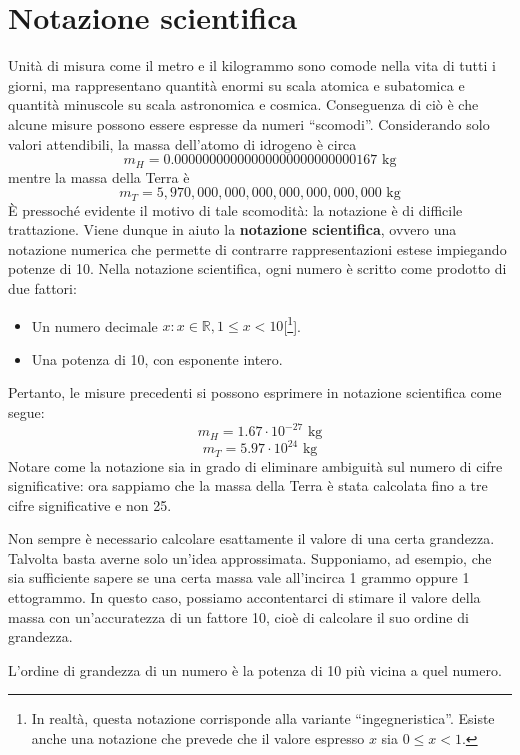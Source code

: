 \section{Notazione scientifica}
Unità di misura come il metro e il kilogrammo sono comode nella vita di tutti i
giorni, ma rappresentano quantità enormi su scala atomica e subatomica e quantità
minuscole su scala astronomica e cosmica. Conseguenza di ciò è che alcune misure
possono essere espresse da numeri ``scomodi''. Considerando solo valori attendibili,
la massa dell'atomo di idrogeno è circa
\[ m_H = 0.000 000 000 000 000 000 000 000 001 67 \text{ kg} \]
mentre la massa della Terra è
\[ m_T = 5,970,000,000,000,000,000,000,000 \text{ kg} \]
È pressoché evidente il motivo di tale scomodità: la notazione è di difficile
trattazione. Viene dunque in aiuto la \textbf{notazione scientifica}, ovvero una
notazione numerica che permette di contrarre rappresentazioni estese impiegando
potenze di 10. Nella notazione scientifica, ogni numero è scritto come prodotto
di due fattori:
\begin{itemize}
    \item Un numero decimale $x:x\in \mathbb{R}, 1\leq x < 10$[\footnote{In realtà, questa notazione corrisponde alla variante ``ingegneristica''. Esiste anche una notazione che prevede che il valore espresso $x$ sia $0\leq x < 1$.}].
    \item Una potenza di 10, con esponente intero.
\end{itemize}
Pertanto, le misure precedenti si possono esprimere in notazione scientifica come
segue:
\[ m_H = 1.67 \cdot 10^{-27} \text{ kg} \]
\[ m_T = 5.97 \cdot 10^{24} \text{ kg}\]
Notare come la notazione sia in grado di eliminare ambiguità sul numero di cifre
significative: ora sappiamo che la massa della Terra è stata calcolata fino a
tre cifre significative e non 25.

Non sempre è necessario calcolare esattamente il valore di una certa grandezza.
Talvolta basta averne solo un'idea approssimata. Supponiamo, ad esempio, che sia
sufficiente sapere se una certa massa vale all'incirca 1 grammo oppure 1
ettogrammo. In questo caso, possiamo accontentarci di stimare il valore della
massa con un'accuratezza di un fattore 10, cioè di calcolare il suo ordine di
grandezza.

\begin{tcolorbox}[colback = yellow!30, colframe = yellow!30!black, title = {Ordine di grandezza}]
L'ordine di grandezza di un numero è la potenza di 10 più vicina a quel numero.
\end{tcolorbox}

